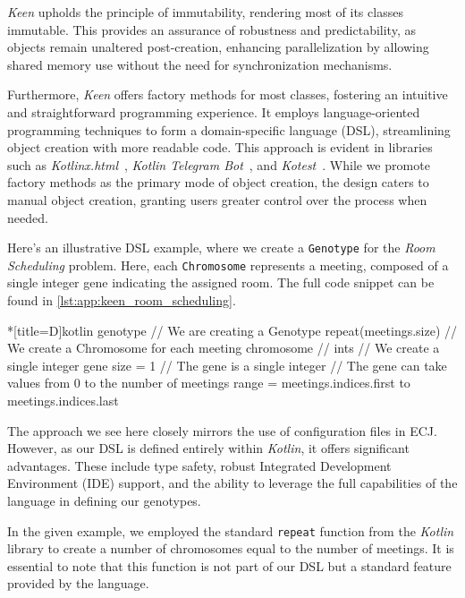     \textit{Keen} upholds the principle of immutability, rendering most of its classes immutable.
    This provides an assurance of robustness and predictability, as objects remain unaltered post-creation, enhancing parallelization by allowing shared memory use without the need for synchronization mechanisms.

    Furthermore, \textit{Keen} offers factory methods for most classes, fostering an intuitive and straightforward programming experience.
    It employs language-oriented programming techniques to form a domain-specific language (DSL), streamlining object creation with more readable code.
    This approach is evident in libraries such as \textit{Kotlinx.html}~\autocite{KotlinxHtml2023}, \textit{Kotlin Telegram Bot}~\autocite{KotlinTelegramBot2023}, and \textit{Kotest}~\autocite{KotestKotesta}.
    While we promote factory methods as the primary mode of object creation, the design caters to manual object creation, granting users greater control over the process when needed.


    Here's an illustrative DSL example, where we create a \texttt{Genotype} for the \textit{Room Scheduling} problem.
    Here, each \texttt{Chromosome} represents a meeting, composed of a single integer gene indicating the assigned room.
    The full code snippet can be found in \vref{lst:app:keen_room_scheduling}.

    \begin{code}*[title={D}]{kotlin}
        genotype {                  // We are creating a Genotype
            repeat(meetings.size) { // We create a Chromosome for each meeting
                chromosome {        //
                    ints {          // We create a single integer gene
                        size = 1    // The gene is a single integer
                        // The gene can take values from 0 to the number of meetings
                        range = meetings.indices.first to meetings.indices.last
                    }
                }
            }
        }
    \end{code}

    The approach we see here closely mirrors the use of configuration files in 
    ECJ.
    However, as our DSL is defined entirely within \textit{Kotlin}, it offers 
    significant advantages.
    These include type safety, robust Integrated Development Environment (IDE) 
    support, and the ability to leverage the full capabilities of the language 
    in defining our genotypes.

    In the given example, we employed the standard \texttt{repeat} function 
    from the \textit{Kotlin} library to create a number of chromosomes equal to 
    the number of meetings.
    It is essential to note that this function is not part of our DSL but a 
    standard feature provided by the language.

